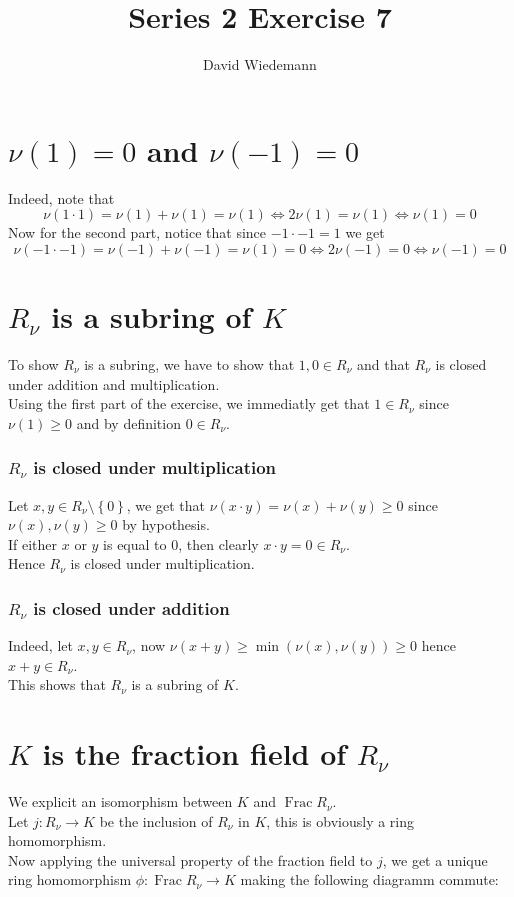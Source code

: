 \documentclass[11pt, a4paper]{article}
\DeclareMathOperator{\fr}{Frac}
\begin{document}
\title{Series 2 Exercise 7}
\author{David Wiedemann}
\maketitle
\section{$\nu( 1) = 0$ and $\nu( -1) =0$  }
Indeed, note that 
\[ 
\nu( 1\cdot 1) = \nu( 1) +\nu( 1) = \nu(1) \iff 2\nu( 1) =\nu( 1) \iff \nu( 1) =0
\]
Now for the second part, notice that since $-1\cdot -1 = 1$ we get
\[ 
\nu( -1\cdot -1) = \nu( -1) +\nu( -1) = \nu( 1) = 0\iff 2\nu( -1) =0 \iff \nu( -1) =0
\]
\section{$R_\nu$ is a subring of $K$ }
To show $R_\nu$ is a subring, we have to show that $  1,0\in R_{\nu} $ and that $R_\nu$  is closed under addition and multiplication.\\

Using the first part of the exercise, we immediatly get that $1\in R_\nu$ since $\nu( 1) \geq 0$  and by definition $0\in R_\nu$.
\subsubsection*{ $R_\nu$ is closed under multiplication}
Let $x,y \in R_\nu\setminus \left\{ 0 \right\} 	$, we get that $\nu( x\cdot y) = \nu( x) +\nu( y) \geq 0$ since $\nu( x) ,\nu( y) \geq 0$ by hypothesis.\\
If either $x$ or $y$ is equal to 0, then clearly $x\cdot y = 0\in R_\nu.$\\
Hence $R_\nu$ is closed under multiplication.
\subsubsection*{ $R_\nu$ is closed under addition}
Indeed, let $x,y\in R_\nu$, now $ \nu( x+y) \geq \min ( \nu( x) ,\nu( y) ) \geq 0$ hence $x+y\in R_\nu$.\\

This shows that $R_\nu$ is a subring of $K$.
\section{$K$ is the fraction field of $R_\nu$ }
We explicit an isomorphism between $K$ and $\fr R_\nu$.\\
Let $j: R_\nu \to K$ be the inclusion of $R_\nu$ in $K$, this is obviously a ring homomorphism.\\
Now applying the universal property of the fraction field to $j$, we get a unique ring homomorphism $\phi: \fr R_\nu\to K$ making the following diagramm commute:
\end{document}
